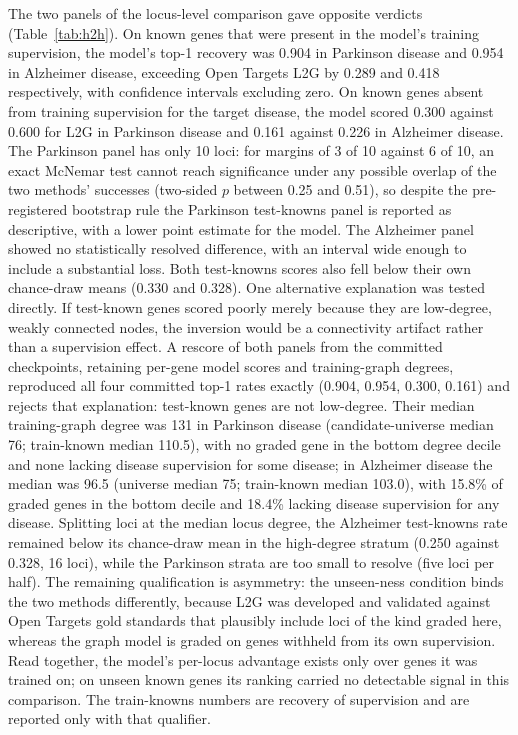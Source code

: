 \documentclass[11pt]{article}
\begin{document}
The two panels of the locus-level comparison gave opposite verdicts (Table~\ref{tab:h2h}). On known genes that were present in the model's training supervision, the model's top-1 recovery was 0.904 in Parkinson disease and 0.954 in Alzheimer disease, exceeding Open Targets L2G by 0.289 and 0.418 respectively, with confidence intervals excluding zero. On known genes absent from training supervision for the target disease, the model scored 0.300 against 0.600 for L2G in Parkinson disease and 0.161 against 0.226 in Alzheimer disease. The Parkinson panel has only 10 loci: for margins of 3 of 10 against 6 of 10, an exact McNemar test cannot reach significance under any possible overlap of the two methods' successes (two-sided $p$ between 0.25 and 0.51), so despite the pre-registered bootstrap rule the Parkinson test-knowns panel is reported as descriptive, with a lower point estimate for the model. The Alzheimer panel showed no statistically resolved difference, with an interval wide enough to include a substantial loss. Both test-knowns scores also fell below their own chance-draw means (0.330 and 0.328). One alternative explanation was tested directly. If test-known genes scored poorly merely because they are low-degree, weakly connected nodes, the inversion would be a connectivity artifact rather than a supervision effect. A rescore of both panels from the committed checkpoints, retaining per-gene model scores and training-graph degrees, reproduced all four committed top-1 rates exactly (0.904, 0.954, 0.300, 0.161) and rejects that explanation: test-known genes are not low-degree. Their median training-graph degree was 131 in Parkinson disease (candidate-universe median 76; train-known median 110.5), with no graded gene in the bottom degree decile and none lacking disease supervision for some disease; in Alzheimer disease the median was 96.5 (universe median 75; train-known median 103.0), with 15.8\% of graded genes in the bottom decile and 18.4\% lacking disease supervision for any disease. Splitting loci at the median locus degree, the Alzheimer test-knowns rate remained below its chance-draw mean in the high-degree stratum (0.250 against 0.328, 16 loci), while the Parkinson strata are too small to resolve (five loci per half). The remaining qualification is asymmetry: the unseen-ness condition binds the two methods differently, because L2G was developed and validated against Open Targets gold standards that plausibly include loci of the kind graded here, whereas the graph model is graded on genes withheld from its own supervision. Read together, the model's per-locus advantage exists only over genes it was trained on; on unseen known genes its ranking carried no detectable signal in this comparison. The train-knowns numbers are recovery of supervision and are reported only with that qualifier.
\end{document}
